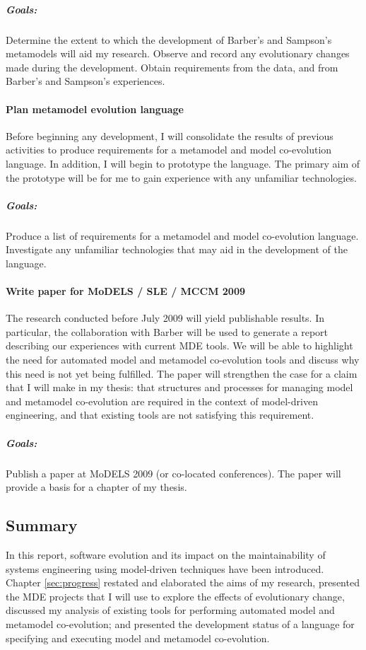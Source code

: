 \subparagraph{Goals:} Determine the extent to which the development of Barber's and Sampson's metamodels will aid my research. Observe and record any evolutionary changes made during the development. Obtain requirements from the data, and from Barber's and Sampson's experiences.



\paragraph{Plan metamodel evolution language} %
\label{par:plan_metamodel_evolution_language}
Before beginning any development, I will consolidate the results of previous activities to produce requirements for a metamodel and model co-evolution language. In addition, I will begin to prototype the language. The primary aim of the prototype will be for me to gain experience with any unfamiliar technologies.

\subparagraph{Goals:} Produce a list of requirements for a metamodel and model co-evolution language. Investigate any unfamiliar technologies that may aid in the development of the language.



\paragraph{Write paper for MoDELS / SLE / MCCM 2009} %
\label{par:write_paper_for_models_sle_mccm_2009}
The research conducted before July 2009 will yield publishable results. In particular, the collaboration with Barber will be used to generate a report describing our experiences with current MDE tools. We will be able to highlight the need for automated model and metamodel co-evolution tools and discuss why this need is not yet being fulfilled. The paper will strengthen the case for a claim that I will make in my thesis: that structures and processes for managing model and metamodel co-evolution are required in the context of model-driven engineering, and that existing tools are not satisfying this requirement.

\subparagraph{Goals:} Publish a paper at MoDELS 2009 (or co-located conferences). The paper will provide a basis for a chapter of my thesis.


\subsection{Summary}
In this report, software evolution and its impact on the maintainability of systems engineering using model-driven techniques have been introduced. Chapter \ref{sec:progress} restated and elaborated the aims of my research, presented the MDE projects that I will use to explore the effects of evolutionary change, discussed my analysis of existing tools for performing automated model and metamodel co-evolution; and presented the development status of a language for specifying and executing model and metamodel co-evolution.

